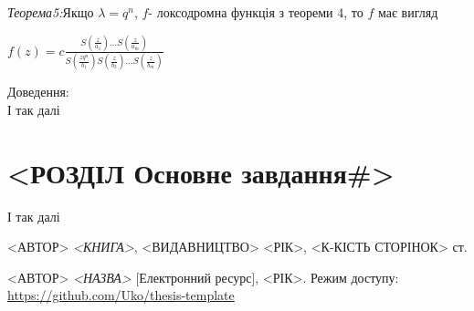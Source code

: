 \documentclass[12pt,a4paper]{article}
\begin{document}
\emph{Теорема5:}Якщо $\lambda =q^{n}$, $f$- локсодромна функція з теореми 4, то  $f$ має вигляд\\
 \begin{center}
 $f(z)= c\tfrac{S(\frac{z}{a_{1}})...S(\frac{z}{a_{m}})}{S(\frac{zq^{n}}{b_{1}})S(\frac{z}{b_{2}})...S(\frac{z}{b_{m}})}$
 \end{center}
Доведення:\\


І так далі\cite{web}

\clearpage
\section{<РОЗДІЛ Основне завдання\#>}



І так далі\cite{web}

\clearpage
{}
\begin{thebibliography}{9}

  <АВТОР> \emph{<КНИГА>},
    <ВИДАВНИЦТВО> <РІК>, <К-КІСТЬ СТОРІНОК> ст.
    
  <АВТОР> \emph{<НАЗВА>} [Електронний ресурс],
    <РІК>. Режим доступу:
    \url{https://github.com/Uko/thesis-template}

\end{thebibliography}
\end{document}
